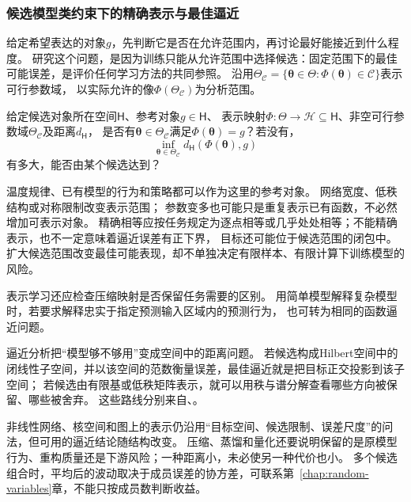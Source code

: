 \subsubsection{候选模型类约束下的精确表示与最佳逼近}
\label{sec:future-analysis-representation}

给定希望表达的对象$g$，先判断它是否在允许范围内，再讨论最好能接近到什么程度。
研究这个问题，是因为训练只能从允许范围中选择候选：固定范围下的最佳可能误差，是评价任何学习方法的共同参照。
沿用$\Theta_{\mathcal C}=\{\bm\theta\in\Theta:\Phi(\bm\theta)\in\mathcal C\}$表示可行参数域，
以实际允许的像$\Phi(\Theta_{\mathcal C})$为分析范围。

\begin{mathproblem}[目标的表示与逼近]
  \label{question:future-representation}
  给定候选对象所在空间$\mathsf H$、参考对象$g\in\mathsf H$、
  表示映射$\Phi:\Theta\to\mathcal H\subseteq\mathsf H$、非空可行参数域$\Theta_{\mathcal C}$及距离$d_{\mathsf H}$，
  是否有$\bm\theta\in\Theta_{\mathcal C}$满足$\Phi(\bm\theta)=g$？若没有，
  \[
    \inf_{\bm\theta\in\Theta_{\mathcal C}}
      d_{\mathsf H}(\Phi(\bm\theta),g)
  \]
  有多大，能否由某个候选达到？
\end{mathproblem}

温度规律、已有模型的行为和策略都可以作为这里的参考对象。
网络宽度、低秩结构或对称限制改变表示范围；
参数变多也可能只是重复表示已有函数，不必然增加可表示对象。
精确相等应按任务规定为逐点相等或几乎处处相等；不能精确表示，也不一定意味着逼近误差有正下界，
目标还可能位于候选范围的闭包中。扩大候选范围改变最佳可能表现，却不单独决定有限样本、有限计算下训练模型的风险。

表示学习还应检查压缩映射是否保留任务需要的区别。
用简单模型解释复杂模型时，若要求解释忠实于指定预测输入区域内的预测行为，
也可转为相同的函数逼近问题。

逼近分析把“模型够不够用”变成空间中的距离问题。
若候选构成Hilbert空间中的闭线性子空间，并以该空间的范数衡量误差，最佳逼近就是把目标正交投影到该子空间；
若候选由有限基或低秩矩阵表示，就可以用秩与谱分解查看哪些方向被保留、哪些被舍弃。
这些路线分别来自、。

非线性网络、核空间和图上的表示仍沿用“目标空间、候选限制、误差尺度”的问法，但可用的逼近结论随结构改变。
压缩、蒸馏和量化还要说明保留的是原模型行为、重构质量还是下游风险；一种距离小，未必使另一种代价也小。
多个候选组合时，平均后的波动取决于成员误差的协方差，可联系第~\ref{chap:random-variables}章，不能只按成员数判断收益。

